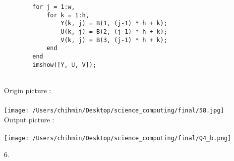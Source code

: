 \documentclass{article}
\begin{document}
\begin{enumerate*}
\begin{enumerate}
\begin{lstlisting}
		for j = 1:w,
			for k = 1:h,  
				Y(k, j) = B(1, (j-1) * h + k);
				U(k, j) = B(2, (j-1) * h + k);
				V(k, j) = B(3, (j-1) * h + k);
			end
		end
		imshow([Y, U, V]);
      \end{lstlisting} \ \\
	  Origin picture : \ \\ \ \\ 
      \texttt{[image: /Users/chihmin/Desktop/science\_computing/final/58.jpg]} \ \\
      Output picture : \ \\ \ \\
      \texttt{[image: /Users/chihmin/Desktop/science\_computing/final/Q4\_b.png]}
	
    \end{enumerate}  
    \item [6.] \\   
  \end{enumerate*}
\end{document}
